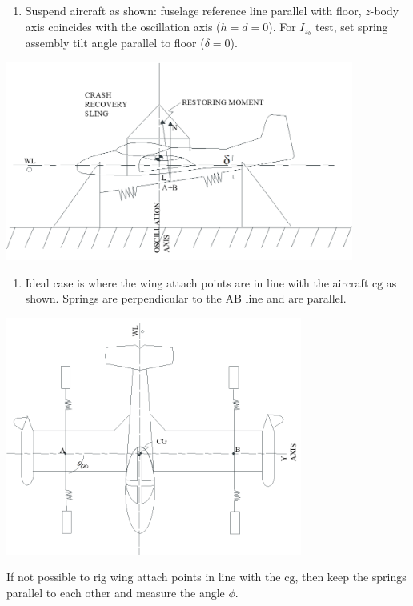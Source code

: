\documentclass[
]{book}
\providecommand{\tightlist}{%
  \setlength{\itemsep}{0pt}\setlength{\parskip}{0pt}}
\begin{document}
\begin{enumerate}
\def\labelenumi{\arabic{enumi}.}
\tightlist
\item
  Suspend aircraft as shown: fuselage reference line parallel with floor, \(z\)-body axis coincides with the oscillation axis (\(h = d = 0\)). For \(I_{z_b}\) test, set spring assembly tilt angle parallel to floor (\(\delta = 0\)).
\end{enumerate}

\includegraphics[width=4.5in,height=2.57292in]{media/07/image36.png}~

\begin{enumerate}
\def\labelenumi{\arabic{enumi}.}
\setcounter{enumi}{1}
\tightlist
\item
  Ideal case is where the wing attach points are in line with the aircraft \(\mathrm{cg}\) as shown. Springs are perpendicular to the AB line and are parallel.
\end{enumerate}

\includegraphics[width=3.83194in,height=3.08333in]{media/07/image37.png}

If not possible to rig wing attach points in line with the \(\mathrm{cg}\), then keep the springs parallel to each other and measure the angle \(\phi\).~~
\end{document}
